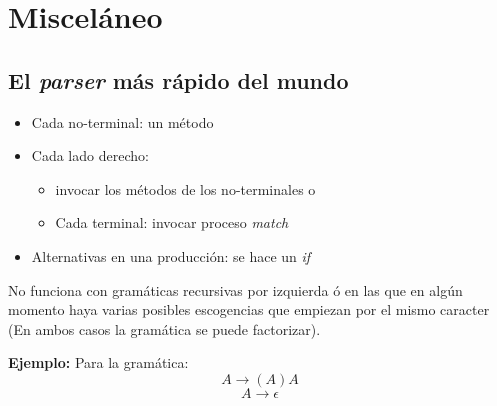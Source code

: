 \documentclass[10pt,letterpaper,twocolumn,twosided]{article}
\newcommand{\codigofuente}[1]{

\dotfill
}
\begin{document}
\section{Misceláneo}
\subsection{El \textit{parser} más rápido del mundo}
\begin{itemize}
\item Cada no-terminal: un método
\item Cada lado derecho:
  \begin{itemize}
  \item invocar los métodos de los no-terminales o
  \item Cada terminal: invocar proceso \textit{match}
  \end{itemize}
\item Alternativas en una producción: se hace un \textit{if}
\end{itemize}
\medskip
No funciona con gramáticas recursivas por izquierda ó en las que en algún momento haya
varias posibles escogencias que empiezan por el mismo caracter (En ambos casos la gramática se puede factorizar).

\medskip
\textbf{Ejemplo:} Para la gramática:
$$
A \longrightarrow (A)A
$$ $$
A \longrightarrow \epsilon
$$

\codigofuente{./src/misc/parser_recursivo_desc.cpp}
\end{document}
